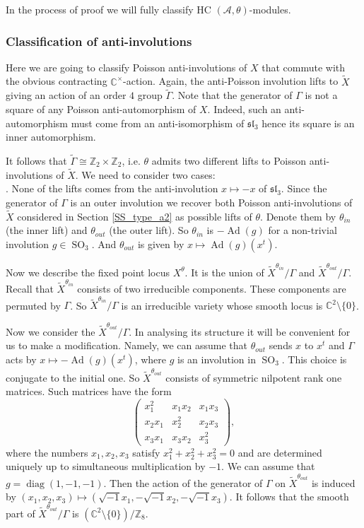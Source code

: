 \documentclass[12pt]{amsart}
\newcommand{\C}{\mathbb{C}}
\newcommand{\A}{\mathcal{A}}
\newcommand{\Z}{\mathbb{Z}}
\theoremstyle{definition}
\numberwithin{equation}{section}
\begin{document}
In the process of proof we will fully classify HC $(\A,\theta)$-modules.

\subsubsection{Classification of anti-involutions}\label{SSS_a2S2_involutions}
Here we are going to classify Poisson anti-involutions of $X$ that commute
with the obvious contracting $\C^\times$-action. Again, the anti-Poisson
involution lifts to $\tilde{X}$ giving an action of an order $4$ group
$\tilde{\Gamma}$. Note that the generator of $\Gamma$ is not a square of
any Poisson anti-automorphism of $X$. Indeed, such an anti-automorphism
must come from an anti-isomorphism of $\mathfrak{sl}_3$ hence its square is an inner
automorphism.

It follows that
$\tilde{\Gamma}\cong \Z_2\times \Z_2$, i.e. $\theta$ admits two different
lifts to Poisson anti-involutions of $\tilde{X}$. We need to consider
two cases:
\\

. None of the lifts comes from the anti-involution $x\mapsto -x$
of $\mathfrak{sl}_3$.
Since the generator
of $\Gamma$ is an outer involution we recover both  Poisson anti-involutions
of $\tilde{X}$ considered in Section \ref{SS_type_a2}
as possible lifts of $\theta$. Denote them by $\theta_{in}$
(the inner lift) and $\theta_{out}$ (the outer lift). So $\theta_{in}$
is $-\operatorname{Ad}(g)$ for a non-trivial involution $g\in \operatorname{SO}_3$.
And $\theta_{out}$ is given by $x\mapsto \operatorname{Ad}(g)(x^t)$.

Now we describe the fixed point locus $X^\theta$. It is the union of
$\tilde{X}^{\theta_{in}}/\Gamma$ and $\tilde{X}^{\theta_{out}}/\Gamma$.
Recall that $\tilde{X}^{\theta_{in}}$ consists of two irreducible components.
These components are permuted by $\Gamma$. So $\tilde{X}^{\theta_{in}}/\Gamma$
is an irreducible variety whose smooth locus is $\C^2\setminus \{0\}$.

Now we consider the $\tilde{X}^{\theta_{out}}/\Gamma$. In analysing its
structure it will be convenient for us to make a modification. Namely,
we can assume that $\theta_{out}$ sends $x$ to $x^t$ and $\Gamma$
acts by $x\mapsto -\operatorname{Ad}(g)(x^t)$, where $g$ is an involution in $\operatorname{SO}_3$.
This choice is conjugate to the initial one. So $\tilde{X}^{\theta_{out}}$
consists of symmetric nilpotent rank one matrices. Such matrices
have the form
$$\begin{pmatrix} x_1^2& x_1x_2& x_1x_3\\
x_2x_1& x_2^2& x_2x_3\\
x_3x_1& x_3x_2& x_3^2\end{pmatrix},$$
where the numbers $x_1,x_2,x_3$ satisfy $x_1^2+x_2^2+x_3^2=0$ and are determined uniquely up to simultaneous multiplication by $-1$.  We can assume that $g=\operatorname{diag}(1,-1,-1)$.
Then the action of the generator of $\Gamma$ on $\tilde{X}^{\theta_{out}}$ is induced by $(x_1,x_2,x_3)
\mapsto (\sqrt{-1}x_1,-\sqrt{-1}x_2,-\sqrt{-1}x_3)$. It follows that the smooth part of
$\tilde{X}^{\theta_{out}}/\Gamma$ is $(\C^2\setminus \{0\})/\Z_8$.
\\
\end{document}

